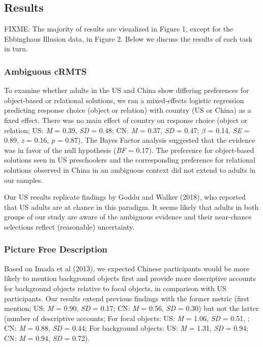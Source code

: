 \documentclass[
  man]{apa6}
\begin{document}
\hypertarget{results}{%
\subsection{Results}\label{results}}

FIXME: The majority of results are visualized in Figure 1, except for the Ebbinghaus Illusion data, in Figure 2. Below we discuss the results of each task in turn.

\hypertarget{ambiguous-crmts-1}{%
\subsubsection{Ambiguous cRMTS}\label{ambiguous-crmts-1}}

To examine whether adults in the US and China show differing preferences for object-based or relational solutions, we ran a mixed-effects logistic regression predicting response choice (object or relation) with country (US or China) as a fixed effect. There was no main effect of country on response choice (object or relation; US: \emph{M} = 0.39, \emph{SD} = 0.48; CN: \emph{M} = 0.37, \emph{SD} = 0.47; \(\beta\) = 0.14, \emph{SE} = 0.89, \emph{z} = 0.16, \emph{p} = 0.87). The Bayes Factor analysis suggested that the evidence was in favor of the null hypothesis (\emph{BF} = 0.17). The preference for object-based solutions seen in US preschoolers and the corresponding preference for relational solutions observed in China in an ambiguous context did not extend to adults in our samples.

Our US results replicate findings by Goddu and Walker (2018), who reported that US adults are at chance in this paradigm. It seems likely that adults in both groups of our study are aware of the ambiguous evidence and their near-chance selections reflect (reasonable) uncertainty.

\hypertarget{picture-free-description}{%
\subsubsection{Picture Free Description}\label{picture-free-description}}

Based on Imada et al (2013), we expected Chinese participants would be more likely to mention background objects first and provide more descriptive accounts for background objects relative to focal objects, in comparison with US participants. Our results extend previous findings with the former metric (first mention; US: \emph{M} = 0.90, \emph{SD} = 0.17; CN: \emph{M} = 0.56, \emph{SD} = 0.30) but not the latter (number of descriptive accounts; For focal objects: US: \emph{M} = 1.06, \emph{SD} = 0.51, ; CN: \emph{M} = 0.88, \emph{SD} = 0.44; For background objects: US: \emph{M} = 1.31, \emph{SD} = 0.94; CN: \emph{M} = 0.94, \emph{SD} = 0.72).
\end{document}
